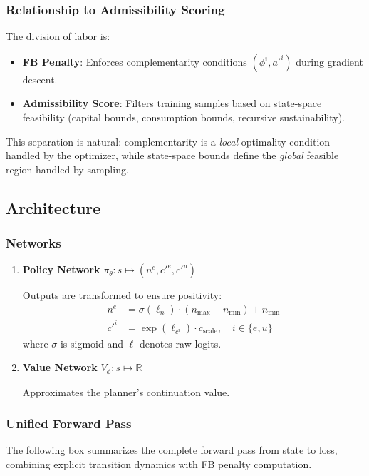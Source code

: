 \subsubsection{Relationship to Admissibility Scoring}
The division of labor is:
\begin{itemize}
    \item \textbf{FB Penalty}: Enforces complementarity conditions $(\phi^i, a'^i)$ during gradient descent.
    \item \textbf{Admissibility Score}: Filters training samples based on state-space feasibility (capital bounds, consumption bounds, recursive sustainability).
\end{itemize}
This separation is natural: complementarity is a \textit{local} optimality condition handled by the optimizer, while state-space bounds define the \textit{global} feasible region handled by sampling.


\subsection{Architecture}

\subsubsection{Networks}
\begin{enumerate}
    \item \textbf{Policy Network} $\pi_\theta: s \mapsto (n^e, c'^e, c'^u)$
    
    Outputs are transformed to ensure positivity:
    \begin{align}
        n^e &= \sigma(\ell_n) \cdot (n_{\max} - n_{\min}) + n_{\min} \\
        c'^i &= \exp(\ell_{c^i}) \cdot c_{\text{scale}}, \quad i \in \{e, u\}
    \end{align}
    where $\sigma$ is sigmoid and $\ell$ denotes raw logits.
    
    \item \textbf{Value Network} $V_\phi: s \mapsto \mathbb{R}$
    
    Approximates the planner's continuation value.
\end{enumerate}

\subsubsection{Unified Forward Pass}
The following box summarizes the complete forward pass from state to loss, combining explicit transition dynamics with FB penalty computation.

